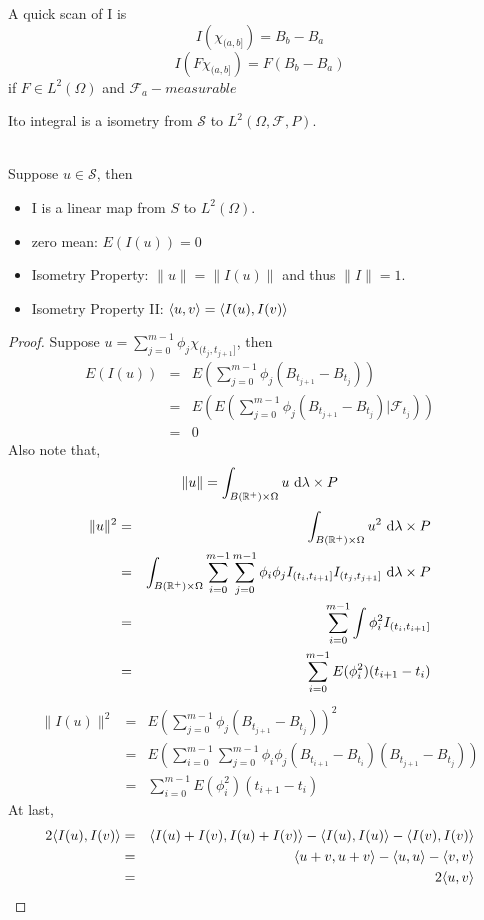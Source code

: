 \documentclass[12pt]{book}
\begin{document}
\begin{remark}
A quick scan of I is 
$$
I(\chi_{(a,b]}) = B_b - B_a 
$$
$$
I(F\chi_{(a,b]}) = F(B_b-B_a)
$$
if $F \in L^2(\Omega)$ and $\mathcal{F}_a-measurable$ 
\end{remark}

Ito integral is a isometry from $\mathcal S$ to $L^2(\Omega,\mathcal{F},P)$.

\begin{theorem} \ \\
Suppose $u\in \mathcal S$, then
\begin{itemize}
	\item I is a linear map from $S$ to $L^2(\Omega)$.
	\item zero mean: $E(I(u))=0$
	\item Isometry Property: $\| u\| = \| I(u)\|$ and thus $\| I\|=1$.
	\item Isometry Property II: ${\langle u,v\rangle}={\langle I(u),I(v)\rangle}$
\end{itemize}
\begin{proof}
Suppose $u = \sum_{j=0}^{m-1}\phi_j \chi_{(t_j,t_{j+1}]}$, then 
\begin{eqnarray*}
E(I(u))&=&E(\sum_{j=0}^{m-1} \phi_j(B_{t_{j+1}}-B_{t_j})) \\
&=&E(E(\sum_{j=0}^{m-1} \phi_j(B_{t_{j+1}}-B_{t_j})|\mathcal{F}_{t_j})) \\
&=&0
\end{eqnarray*}
Also note that, 
$$
\| u \| = \int_{B(\mathbb{R}^+)\times \Omega} u \ \mathrm{d} \lambda \times P
$$
\begin{eqnarray*}
	\| u \|^2 &=& \int_{B(\mathbb{R}^+)\times \Omega} u^2 \ \mathrm{d} \lambda \times P \\
&=& \int_{B(\mathbb{R}^+)\times \Omega} \sum_{i=0}^{m-1}\sum_{j=0}^{m-1}\phi_i \phi_j I_{(t_i,t_{i+1}]}I_{(t_j,t_{j+1}]} \ \mathrm{d} \lambda \times P \\
&=& \sum_{i=0}^{m-1}\int \phi_i^2 I_{(t_i,t_{i+1}]} \\
&=& \sum_{i=0}^{m-1} E(\phi_i^2)(t_{i+1}-t_i)
\end{eqnarray*}
\begin{eqnarray*}
\| I(u) \|^2 &=& E(\sum_{j=0}^{m-1} \phi_j(B_{t_{j+1}}-B_{t_j}))^2 \\
&=& E(\sum_{i=0}^{m-1}\sum_{j=0}^{m-1}\phi_i\phi_j(B_{t_{i+1}}-B_{t_i})(B_{t_{j+1}}-B_{t_j})) \\
&=& \sum_{i=0}^{m-1} E(\phi_i^2)(t_{i+1}-t_i)
\end{eqnarray*}
At last, 
\begin{eqnarray*}
	2{\langle I(u),I(v)\rangle} &=& {\langle I(u)+I(v),I(u)+I(v)\rangle}-{\langle I(u),I(u)\rangle}-{\langle I(v),I(v)\rangle} \\
	&=& {\langle u+v,u+v\rangle}-{\langle u,u\rangle}-{\langle v,v\rangle} \\
	&=& 2{\langle u,v\rangle}
\end{eqnarray*}
\end{proof}
\end{theorem}
\end{document}
